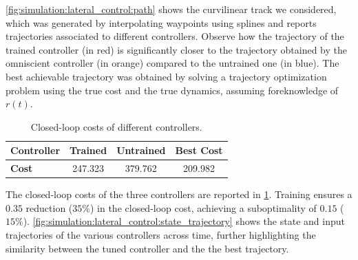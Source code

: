 \documentclass[journal,twoside,web,final]{ieeecolor}
\theoremstyle{definition}
\begin{document}
\cref{fig:simulation:lateral_control:path} shows the curvilinear track we considered, which was generated by interpolating waypoints using splines and reports trajectories associated to different controllers.
Observe how the trajectory of the trained controller (in red) is significantly closer to the trajectory obtained by the omniscient controller (in orange) compared to the untrained one (in blue).
The best achievable trajectory was obtained by solving a trajectory optimization problem using the true cost and the true dynamics,
assuming foreknowledge of $r(t)$.

\begin{table}[hb]
\caption{Closed-loop costs of different controllers.}
\label{table:simulation:laterl_control:closed_loop_costs}
\centering
\begin{tabular}{ l c c c}
\toprule
\textbf{Controller} & Trained & Untrained & Best Cost \\
\midrule
\textbf{Cost} & 247.323 & 379.762 & 209.982 \\
\bottomrule
\end{tabular}
\end{table}

The closed-loop costs of the three controllers are reported in \cref{table:simulation:laterl_control:closed_loop_costs}.
Training ensures a $0.35$ reduction ($35\%$) in the closed-loop cost,
achieving a suboptimality of $0.15$ ($15\%$).
\cref{fig:simulation:lateral_control:state_trajectory} shows the state and input trajectories of the various controllers across time,
further highlighting the similarity between the tuned controller and the the best trajectory.
\end{document}
